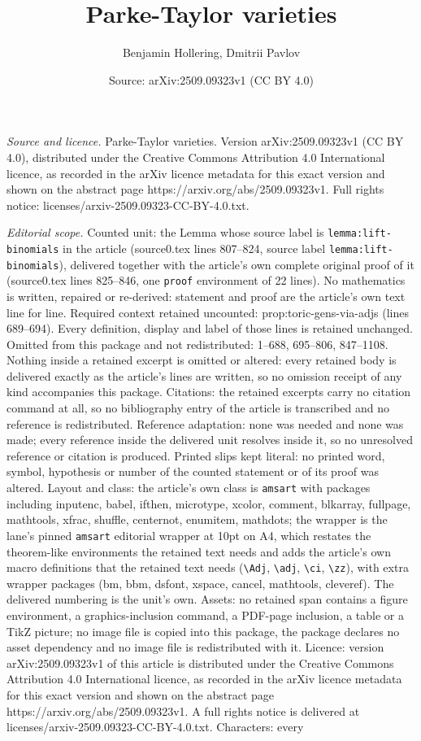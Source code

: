 \documentclass[10pt,a4paper]{amsart}
\title[Parke-Taylor varieties]{Parke-Taylor varieties}
\author{Benjamin Hollering, Dmitrii Pavlov}
\date{Source: arXiv:2509.09323v1 (CC BY 4.0)}
\begin{document}
\maketitle

\noindent\emph{Source and licence.} Parke-Taylor varieties. Version arXiv:2509.09323v1 (CC BY 4.0), distributed under the Creative Commons Attribution 4.0 International licence, as recorded in the arXiv licence metadata for this exact version and shown on the abstract page https://arxiv.org/abs/2509.09323v1. Full rights notice: licenses/arxiv-2509.09323-CC-BY-4.0.txt.\par\smallskip

\noindent\textit{Editorial scope.} Counted unit: the Lemma whose source label is \texttt{lemma:lift-binomials} in the article (source0.tex lines 807--824, source label \texttt{lemma:lift-binomials}), delivered together with the article's own complete original proof of it (source0.tex lines 825--846, one \texttt{proof} environment of 22 lines). No mathematics is written, repaired or re-derived: statement and proof are the article's own text line for line. Required context retained uncounted: prop:toric-gens-via-adjs (lines 689--694). Every definition, display and label of those lines is retained unchanged. Omitted from this package and not redistributed: 1--688, 695--806, 847--1108. Nothing inside a retained excerpt is omitted or altered: every retained body is delivered exactly as the article's lines are written, so no omission receipt of any kind accompanies this package. Citations: the retained excerpts carry no citation command at all, so no bibliography entry of the article is transcribed and no reference is redistributed. Reference adaptation: none was needed and none was made; every reference inside the delivered unit resolves inside it, so no unresolved reference or citation is produced. Printed slips kept literal: no printed word, symbol, hypothesis or number of the counted statement or of its proof was altered. Layout and class: the article's own class is \texttt{amsart} with packages including inputenc, babel, ifthen, microtype, xcolor, comment, blkarray, fullpage, mathtools, xfrac, shuffle, centernot, enumitem, mathdots; the wrapper is the lane's pinned \texttt{amsart} editorial wrapper at 10pt on A4, which restates the theorem-like environments the retained text needs and adds the article's own macro definitions that the retained text needs (\texttt{\textbackslash Adj}, \texttt{\textbackslash adj}, \texttt{\textbackslash ci}, \texttt{\textbackslash zz}), with extra wrapper packages (bm, bbm, dsfont, xspace, cancel, mathtools, cleveref). The delivered numbering is the unit's own. Assets: no retained span contains a figure environment, a graphics-inclusion command, a PDF-page inclusion, a table or a TikZ picture; no image file is copied into this package, the package declares no asset dependency and no image file is redistributed with it. Licence: version arXiv:2509.09323v1 of this article is distributed under the Creative Commons Attribution 4.0 International licence, as recorded in the arXiv licence metadata for this exact version and shown on the abstract page https://arxiv.org/abs/2509.09323v1. A full rights notice is delivered at licenses/arxiv-2509.09323-CC-BY-4.0.txt. Characters: every 
\end{document}
